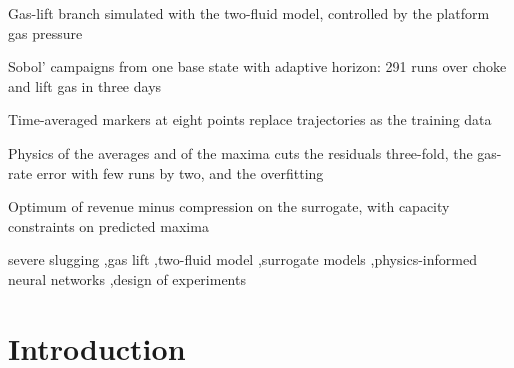 \documentclass[a4paper,fleqn]{cas-sc}
\begin{document}
\begin{abstract}
\SI{1.75}{\kilogram\per\second} as the capacity constraint, at the prices of the example, the compression costs one per cent of the revenue and the optimum is at about \SI{227}{\bar} with the compressor as the active constraint and the choke opening indifferent above 0.7; the objective is nearly flat along the constraint, smaller compressors move the optimum down the valve law to the edge of the stable region, and an operating curve, the optimal opening and margin for each platform pressure, shows the choke open from 110 to \SI{226}{\bar} and throttled beyond the compressor limit. The campaign is the whole cost of the method, 75 process-hours of simulation against a second of training and a fraction of a second for every optimisation, which on the simulator would take a year.
\end{abstract}

\begin{highlights}
\item Gas-lift branch simulated with the two-fluid model, controlled by the platform gas pressure
\item Sobol' campaigns from one base state with adaptive horizon: 291 runs over choke and lift gas in three days
\item Time-averaged markers at eight points replace trajectories as the training data
\item Physics of the averages and of the maxima cuts the residuals three-fold, the gas-rate error with few runs by two, and the overfitting
\item Optimum of revenue minus compression on the surrogate, with capacity constraints on predicted maxima
\end{highlights}

\begin{keywords}
severe slugging \sep gas lift \sep two-fluid model \sep surrogate models \sep physics-informed neural networks \sep design of experiments
\end{keywords}

\maketitle

\section{Introduction}\label{sec:intro}
\end{document}
